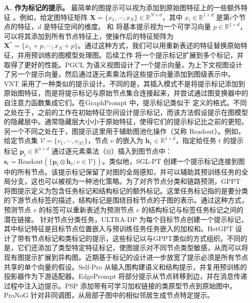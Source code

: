 \textbf{A. 作为标记的提示。}
最简单的图提示可以视为添加到原始图特征上的一些额外特征 \cite{zhu2023graphcontrol}。例如，给定图特征矩阵 $\mathbf{X}=\{x_1,\cdots, x_N\} \in \mathbb{R}^{N\times d}$，其中 $x_i\in \mathbb{R}^{1\times d}$ 是第$i$个节点的特征，$d$ 是特征空间的维度。\citet{fang2022prompt} 和 \citet{shirkavand2023deep} 将基本提示视为一个可学习向量 $p \in \mathbb{R}^{1\times d}$，可以将其添加到所有节点特征上，使操作后的特征矩阵为 $\mathbf{X}^{*}=\{x_1+p,\cdots, x_N+p\}$。通过这种方式，我们可以用重新表述的特征替换原始特征，并用预训练的图模型处理图。后续工作 \cite{fang2023universal} 将一个提示标记扩展到多个标记，并取得了更好的性能。PGCL \cite{gong2023prompt} 为语义视图设计了一个提示向量，为上下文视图设计了另一个提示向量，然后通过逐元素乘法将这些提示向量添加到图级表示中。VNT \cite{tan2023virtual} 采用了一种类似的提示设计。不同的是，其插入模式不是将提示标记添加到原始图特征，而是将提示标记与原始节点集合连接起来，并尝试通过图变换器中的自注意力函数集成它们。在GraphPrompt \cite{liu2023graphprompt} 中，提示标记类似于 \citet{fang2022prompt} 定义的格式。不同之处在于，之前的工作在初始特征空间设计提示标记，而该方法假设提示在图模型的隐藏层中。通常隐藏层大小小于原始特征，使得它们的提示标记比之前的更短。另一个不同之处在于，图提示这里用于辅助图池化操作（又称 $\text{Readout}$）。例如，给定节点集 $\mathcal{V}=\{v_1,\cdots, v_{|\mathcal{V}|}\}$，节点 $v$ 的嵌入为 $\textbf{h}_v \in \mathbb{R}^{1\times d}$，指定给任务 $t$ 的提示标记 $\textbf{p}_t \in \mathbb{R}^{1\times d}$ 通过逐元素乘法（$\otimes$）插入到图节点中：$\textbf{s}_t=\text{Readout}(\{\textbf{p}_t \otimes \textbf{h}_v:v \in \mathcal{V}\})$。类似地，SGL-PT \cite{zhu2023sglpt} 创建一个提示标记连接到图中的所有节点。该提示标记保留了对图的全局感知，并可以辅助其预训练任务的全局分支，这也可以被视为一种池化策略。为了对齐节点分类和链路预测，GPPT \cite{sun2022gppt} 将图提示定义为包含任务标记和结构标记的额外标记。这里任务标记指的是要分类的下游节点标签的描述，结构标记是围绕目标节点的子图的表示。通过这种方式，预测节点 $v$ 的标签可以重新表述为预测节点 $v$ 的结构标记与标签任务标记之间的潜在链接。
针对节点分类任务，ULTRA-DP \cite{chen2023ultradp} 为每个目标节点创建一个提示标记，其中标记特征是目标节点位置嵌入与预训练任务任务嵌入的加权和。HetGPT \cite{ma2023hetgpt} 设计了带有节点标记和类标记的提示，这些标记以与GPPT类似的方式组织。不同的是，它们还添加了类型特定特征标记，使图提示对不同节点类型敏感，从而可以将现有图提示扩展到异构图。近期基于标记的设计进一步放宽了提示必须是所有节点共享的单个向量的假设。Self-Pro \cite{gong2024selfpro} 从输入图构建语义和结构提示，并复用预训练的投影器作为下游适配器。EdgePrompt \cite{fu2025edge} 将部分提示从节点转移到边，并在消息传递过程中注入边提示。PSP \cite{ge2024psp} 添加带有可学习加权链接的类原型节点到原始图中。ProNoG \cite{yu2025pronog} 针对非同调图，从局部子图中的相似邻居生成节点特定提示。




